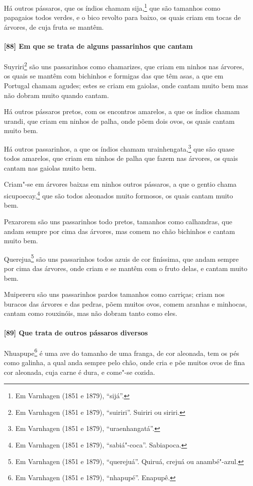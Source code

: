\begin{linenumbers}
Há outros pássaros, que os índios chamam sija,\footnote{ Em Varnhagen (1851 e 1879),
``sijá''.} que são tamanhos como papagaios todos verdes, e o bico revolto para baixo, os
quais criam em tocas de árvores, de cuja fruta se mantêm.

\paragraph{[88] Em que se trata de alguns passarinhos que cantam}\quad
Suyriri\footnote{ Em Varnhagen (1851 e 1879), ``suiriri''. Suiriri ou siriri.} são uns
passarinhos como chamarizes, que criam em ninhos nas árvores, os quais se mantêm com
bichinhos e formigas das que têm asas, a que em Portugal chamam agudes; estes se criam em
gaiolas, onde cantam muito bem mas não dobram muito quando cantam.

Há outros pássaros pretos, com os encontros amarelos, a que os índios chamam urandi, que
criam em ninhos de palha, onde põem dois ovos, os quais cantam muito bem.

Há outros passarinhos, a que os índios chamam urainhengata,\footnote{ Em Varnhagen (1851 e
1879), ``uraenhangatá''.} que são quase todos amarelos, que criam em ninhos de palha que
fazem nas árvores, os quais cantam nas gaiolas muito bem.

Criam"-se em árvores baixas em ninhos outros pássaros, a que o gentio chama
sicupoecay,\footnote{ Em Varnhagen (1851 e 1879), ``sabiá"-coca''. Sabiapoca.} que são
todos aleonados muito formosos, os quais cantam muito bem.


Pexarorem são uns passarinhos todo pretos, tamanhos como calhandras, que andam sempre por
cima das árvores, mas comem no chão bichinhos e cantam muito bem.

Querejua\footnote{ Em Varnhagen (1851 e 1879), ``querejuá''. Quiruá, crejuá ou
anambé"-azul.} são uns passarinhos todos azuis de cor finíssima, que andam sempre por cima
das árvores, onde criam e se mantêm com o fruto delas, e cantam muito bem.

Muipereru são uns passarinhos pardos tamanhos como carriças; criam nos buracos das árvores
e das pedras, põem muitos ovos, comem aranhas e minhocas, cantam como rouxinóis, mas não
dobram tanto como eles.

\paragraph{[89] Que trata de outros pássaros diversos}\quad
Nhuapupe\footnote{ Em Varnhagen (1851 e 1879), ``nhapupé''. Enapupê.} é uma ave do tamanho
de uma franga, de cor aleonada, tem os pés como galinha, a qual anda sempre pelo chão,
onde cria e põe muitos ovos de fina cor aleonada, cuja carne é dura, e come"-se cozida.


\end{linenumbers}
